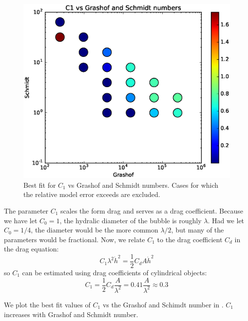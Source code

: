 \begin{figure}
\includegraphics[width=\columnwidth]{figs/C1-vs-Grashof-Schmidt}
\caption{ 
  Best fit for $C_1$ vs Grashof and Schmidt numbers.
  Cases for which the relative model error exceeds \fittol are excluded.
}
\end{figure}

The parameter $C_1$ scales the form drag and serves as a drag coefficient.  
Because we have let $C_0 = 1$, the hydralic diameter of the bubble is roughly $\lambda$.
Had we let $C_0 = 1/4$, the diameter would be the more common $\lambda/2$, but many of the parameters would be fractional.
Now, we relate $C_1$ to the drag coefficient $C_d$ in the drag equation:
\begin{equation}
C_1 \lambda^2 \dot{h}^2 = \frac{1}{2} C_d A \dot{h}^2
\end{equation}
so $C_1$ can be estimated using drag coefficients of cylindrical objects:
\begin{equation}
C_1 = \frac{1}{2} C_d \frac{A}{\lambda^2} = 0.41 \frac{A}{\lambda^2} \approx 0.3
\end{equation}

We plot the best fit values of $C_1$ vs the Grashof and Schimdt number in .
$C_1$ increases with Grashof and Schmidt number.

